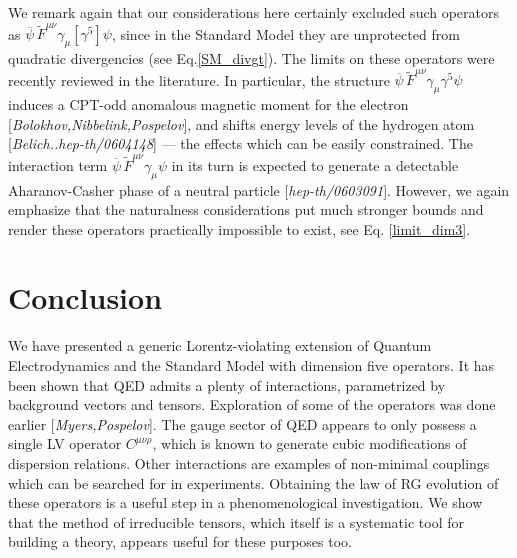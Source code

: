 \documentclass[12pt]{revtex4}
\newcommand{\wt}{\widetilde}
\newcommand{\ov}{\overline}
\begin{document}
	We remark again that our considerations here certainly excluded such 
	operators as $ \ov{\psi}\,\wt{F}^{\mu\nu}\gamma_\mu [\gamma^5] \psi $,
	since in the Standard Model they are unprotected from quadratic divergencies
	(see Eq.\eqref{SM_divgt}).
	The limits on these operators were recently reviewed in the literature.
	In particular, the structure 
	$ \ov{\psi}\,\wt{F}^{\mu\nu}\gamma_\mu \gamma^5 \psi $
	induces a CPT-odd anomalous magnetic moment for the electron 
	[{\it Bolokhov,Nibbelink,Pospelov}], and shifts energy levels of the 
	hydrogen atom [{\it Belich..hep-th/0604148}] ---
	the effects which can be easily constrained.
	The interaction term $ \ov{\psi}\,\wt{F}^{\mu\nu}\gamma_\mu \psi $
	in its turn is expected to generate a detectable 
	Aharanov-Casher phase of a neutral particle [{\it hep-th/0603091}].
	However, we again emphasize that the naturalness considerations
	put much stronger bounds and 
	render these operators practically impossible to exist, 
	see Eq. \eqref{limit_dim3}.
	

%
%
\section{Conclusion}
	We have presented a generic Lorentz-violating extension of 
	Quantum Electrodynamics and the Standard Model with dimension five operators.
	It has been shown that QED admits a plenty of interactions,
	parametrized by background vectors and tensors.
	Exploration of some of the operators was done earlier
	[{\it Myers,Pospelov}].
	The gauge sector of QED appears to only possess a single LV
	operator $ C^{\mu\nu\rho} $, which is known to generate cubic
	modifications of dispersion relations.	
	Other interactions are examples of non-minimal couplings which can
	be searched for in experiments.
	Obtaining the law of RG evolution of these operators is a useful step in a 
	phenomenological investigation.
	We show that the method of irreducible tensors, which itself is a systematic
	tool for building a theory, appears useful for these purposes too.
\end{document}
